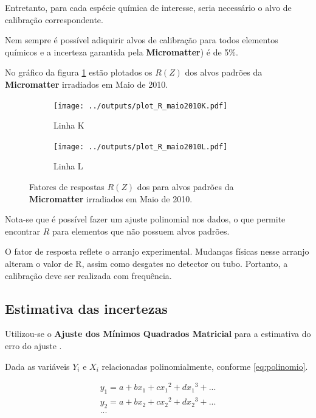 Entretanto, para cada espécie química de interesse, seria necessário 
o alvo de calibração correspondente.

Nem sempre é possível adiquirir alvos de calibração para todos elementos
químicos e a incerteza garantida pela \textbf{Micromatter}) é de 5\%. 

No gráfico da figura \ref{fg:edxrfcalib} estão plotados os $R(Z)$ 
dos alvos padrões da \textbf{Micromatter} irradiados em Maio de 2010. 

\begin{figure}[H]
  \begin{subfigure}[b]{0.45\textwidth}
    \texttt{[image: ../outputs/plot\_R\_maio2010K.pdf]}
    \caption{Linha K}
  \end{subfigure}%
  \begin{subfigure}[b]{0.45\textwidth}
    \texttt{[image: ../outputs/plot\_R\_maio2010L.pdf]}
    \caption{Linha L}
  \end{subfigure}
  \caption{Fatores de respostas $R(Z)$ dos para alvos padrões da 
           \textbf{Micromatter} irradiados em Maio de 2010. 
           \label{fg:edxrfcalib}}
\end{figure}

Nota-se que é possível fazer um ajuste polinomial nos dados, o que 
permite encontrar $R$ para elementos que não possuem alvos padrões.

O fator de resposta reflete o arranjo experimental. Mudanças físicas
nesse arranjo alteram o valor de R, assim como desgates no detector
ou tubo. Portanto, a calibração deve ser realizada com frequência.

\subsection{Estimativa das incertezas}

Utilizou-se o \textbf{Ajuste dos Mínimos Quadrados Matricial} 
para a estimativa do erro do ajuste \citep{helene2006}.

Dada as variáveis $Y_i$ e $X_i$ relacionadas polinomialmente, 
conforme \ref{eq:polinomio}.

\begin{equation}
  \label{eq:polinomio}
  \begin{split}
    y_1 = a + b x_1 + c{x_1}^2 + d{x_1}^3 + ...\\
    y_2 = a + b x_2 + c{x_2}^2 + d{x_2}^3 + ... \\
    ...
  \end{split}
\end{equation}

